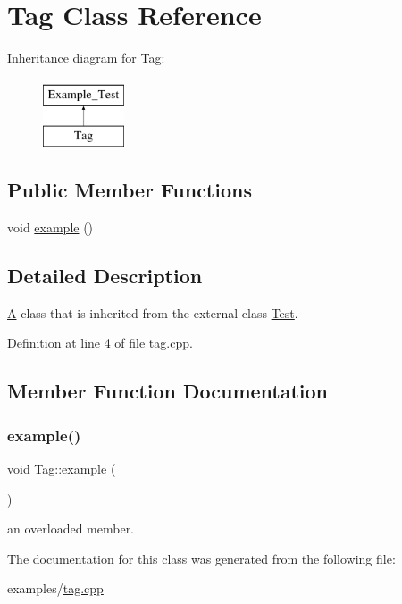\hypertarget{class_tag}{}\section{Tag Class Reference}
\label{class_tag}
Inheritance diagram for Tag\+:\begin{figure}[H]
\begin{center}
\leavevmode
\includegraphics[height=2.000000cm]{class_tag}
\end{center}
\end{figure}
\subsection*{Public Member Functions}
\begin{DoxyCompactItemize}
\item 
void \mbox{\hyperlink{class_tag_acc641ffae34e2c4c03a6edf0a513be28}{example}} ()
\end{DoxyCompactItemize}


\subsection{Detailed Description}
\mbox{\hyperlink{class_a}{A}} class that is inherited from the external class \mbox{\hyperlink{class_test}{Test}}. 

Definition at line 4 of file tag.\+cpp.



\subsection{Member Function Documentation}
\mbox{\label{class_tag_acc641ffae34e2c4c03a6edf0a513be28}} 
\subsubsection{\texorpdfstring{example()}{example()}}
{\footnotesize\ttfamily void Tag\+::example (\begin{DoxyParamCaption}{ }\end{DoxyParamCaption})}

an overloaded member. 

The documentation for this class was generated from the following file\+:\begin{DoxyCompactItemize}
\item 
examples/\mbox{\hyperlink{tag_8cpp}{tag.\+cpp}}\end{DoxyCompactItemize}

